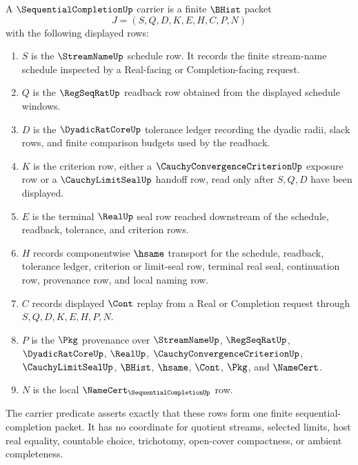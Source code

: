 \begin{definition}
\label{def:sequential-completion-carrier}
A $\SequentialCompletionUp$ carrier is a finite $\BHist$ packet
$$
J=(S,Q,D,K,E,H,C,P,N)
$$
with the following displayed rows:
\begin{enumerate}
\item $S$ is the $\StreamNameUp$ schedule row. It records the finite stream-name schedule inspected by a Real-facing or Completion-facing request.
\item $Q$ is the $\RegSeqRatUp$ readback row obtained from the displayed schedule windows.
\item $D$ is the $\DyadicRatCoreUp$ tolerance ledger recording the dyadic radii, slack rows, and finite comparison budgets used by the readback.
\item $K$ is the criterion row, either a $\CauchyConvergenceCriterionUp$ exposure row or a $\CauchyLimitSealUp$ handoff row, read only after $S,Q,D$ have been displayed.
\item $E$ is the terminal $\RealUp$ seal row reached downstream of the schedule, readback, tolerance, and criterion rows.
\item $H$ records componentwise $\hsame$ transport for the schedule, readback, tolerance ledger, criterion or limit-seal row, terminal real seal, continuation row, provenance row, and local naming row.
\item $C$ records displayed $\Cont$ replay from a Real or Completion request through $S,Q,D,K,E,H,P,N$.
\item $P$ is the $\Pkg$ provenance over $\StreamNameUp$, $\RegSeqRatUp$, $\DyadicRatCoreUp$, $\RealUp$, $\CauchyConvergenceCriterionUp$, $\CauchyLimitSealUp$, $\BHist$, $\hsame$, $\Cont$, $\Pkg$, and $\NameCert$.
\item $N$ is the local $\NameCert_{\SequentialCompletionUp}$ row.
\end{enumerate}
The carrier predicate asserts exactly that these rows form one finite sequential-completion packet. It has no coordinate for quotient streams, selected limits, host real equality, countable choice, trichotomy, open-cover compactness, or ambient completeness.
\end{definition}

